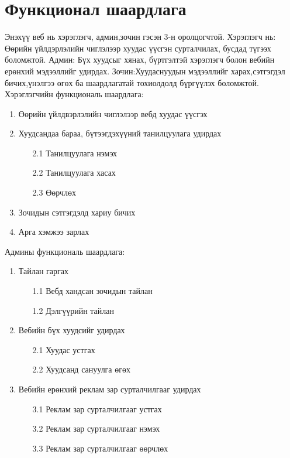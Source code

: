 \section{Функционал шаардлага}
 Энэхүү веб нь хэрэглэгч, админ,зочин гэсэн 3-н оролцогчтой.
Хэрэглэгч нь: Өөрийн үйлдэрлэлийн чиглэлээр хуудас үүсгэн сурталчилах, бусдад түгээх боломжтой.
Админ: Бүх хуудсыг хянах, бүртгэлтэй хэрэглэгч болон вебийн ерөнхий мэдээллийг удирдах.
Зочин:Хуудаснуудын мэдээллийг харах,сэтгэгдэл бичих,үнэлгээ өгөх ба шаардлагатай тохиолдолд бүргүүлэх боломжтой.
Хэрэглэгчийн функциональ шаардлага:
\begin{enumerate}
	\item Өөрийн үйлдвэрлэлийн чиглэлээр вебд хуудас үүсгэх
	\item Хуудсандаа бараа, бүтээгдэхүүний танилцуулага удирдах
	\begin{enumerate}
		\item[2.1] Танилцуулага нэмэх
		\item[2.2] Танилцуулага хасах
		\item[2.3] Өөрчлөх
	\end{enumerate}
	\item Зочидын сэтгэгдэлд хариу бичих
	\item Арга хэмжээ зарлах
\end{enumerate}
Админы функциональ шаардлага:
\begin{enumerate}
	\item Тайлан гаргах
	\begin{enumerate}
		\item[1.1] Вебд хандсан зочидын тайлан
		\item[1.2] Дэлгүүрийн тайлан
	\end{enumerate}
	\item Вебийн бүх хуудсийг удирдах
	\begin{enumerate}
		\item[2.1] Хуудас устгах
		\item[2.2] Хуудсанд сануулга өгөх
	\end{enumerate}
	\item Вебийн ерөнхий реклам зар сурталчилгааг удирдах
	\begin{enumerate}
		\item[3.1] Реклам зар сурталчилгааг устгах
		\item[3.2] Реклам зар сурталчилгааг нэмэх
		\item[3.3] Реклам зар сурталчилгааг өөрчлөх
	\end{enumerate}
\end{enumerate}
